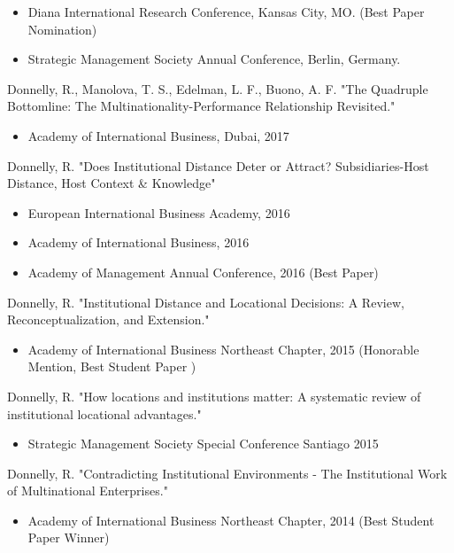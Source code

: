 \documentclass[margin, 12pt]{res}
\begin{document}
\begin{resume}
\begin{itemize}
\item  Diana International Research Conference, Kansas City, MO. (Best Paper Nomination)
\item Strategic Management Society Annual Conference, Berlin, Germany. 
\end{itemize}

\vspace{-0.25cm}

Donnelly, R., Manolova, T. S., Edelman, L. F., Buono, A. F. "The Quadruple Bottomline: The Multinationality-Performance Relationship Revisited." 
\begin{itemize}
\item Academy of International Business, Dubai, 2017
\end{itemize}

\vspace{-0.25cm}
Donnelly, R. "Does Institutional Distance Deter or Attract? Subsidiaries-Host Distance, Host Context \& Knowledge" 
\begin{itemize}
\item European International Business Academy, 2016
\item Academy of International Business, 2016
\item Academy of Management Annual Conference, 2016 (Best Paper)
\end{itemize}
\vspace{-0.25cm}
Donnelly, R. "Institutional Distance and Locational Decisions: A Review, Reconceptualization, and Extension." 


\begin{itemize}
\item Academy of International Business Northeast Chapter, 2015 (Honorable Mention, Best Student Paper )
\end{itemize}



\vspace{-0.25cm}
Donnelly, R.  "How locations and institutions matter: A systematic review of institutional locational advantages." 
\begin{itemize}
\item Strategic Management Society Special Conference Santiago 2015
\end{itemize}
\vspace{-0.25cm}
Donnelly, R.  "Contradicting Institutional Environments - The Institutional Work of Multinational Enterprises."
\begin{itemize}
\item Academy of International Business Northeast Chapter, 2014  (Best Student Paper Winner)


\end{itemize}
\end{resume}
\end{document}
